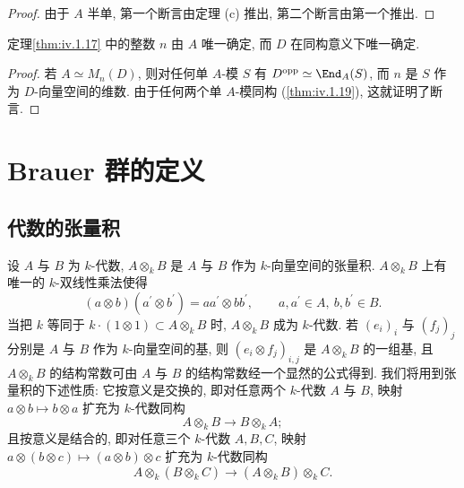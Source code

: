 \begin{proof}
由于 $A$ 半单, 第一个断言由定理 (c) 推出, 第二个断言由第一个推出.
\end{proof}

\begin{corollary}\label{cor:iv.1.22}
定理\ref{thm:iv.1.17} 中的整数 $n$ 由 $A$ 唯一确定, 而 $D$ 在同构意义下唯一确定.
\end{corollary}

\begin{proof}
若 $A\simeq M_n(D)$, 则对任何单 $A$-模 $S$ 有 $D^{\mathrm{opp}}\simeq\End_A(S)$, 而 $n$ 是 $S$ 作为 $D$-向量空间的维数. 由于任何两个单 $A$-模同构 (\ref{thm:iv.1.19}), 这就证明了断言.
\end{proof}

\section{Brauer 群的定义}\label{sec:IV.2}

\subsection*{代数的张量积}

设 $A$ 与 $B$ 为 $k$-代数, $A\otimes_k B$ 是 $A$ 与 $B$ 作为 $k$-向量空间的张量积. $A\otimes_k B$ 上有唯一的 $k$-双线性乘法使得
\[
(a\otimes b)(a^{\prime}\otimes b^{\prime})=aa^{\prime}\otimes bb^{\prime},\qquad a,a^{\prime}\in A,\ b,b^{\prime}\in B.
\]
当把 $k$ 等同于 $k\cdot(1\otimes 1)\subset A\otimes_k B$ 时, $A\otimes_k B$ 成为 $k$-代数. 若 $(e_i)_i$ 与 $(f_j)_j$ 分别是 $A$ 与 $B$ 作为 $k$-向量空间的基, 则 $(e_i\otimes f_j)_{i,j}$ 是 $A\otimes_k B$ 的一组基, 且 $A\otimes_k B$ 的结构常数可由 $A$ 与 $B$ 的结构常数经一个显然的公式得到. 我们将用到张量积的下述性质: 它按意义是交换的, 即对任意两个 $k$-代数 $A$ 与 $B$, 映射 $a\otimes b\mapsto b\otimes a$ 扩充为 $k$-代数同构
\[
A\otimes_{k}B\to B\otimes_{k}A;
\]
且按意义是结合的, 即对任意三个 $k$-代数 $A,B,C$, 映射 $a\otimes(b\otimes c)\mapsto(a\otimes b)\otimes c$ 扩充为 $k$-代数同构
\[
A\otimes_{k}(B\otimes_{k}C)\to(A\otimes_{k}B)\otimes_{k}C.
\]

